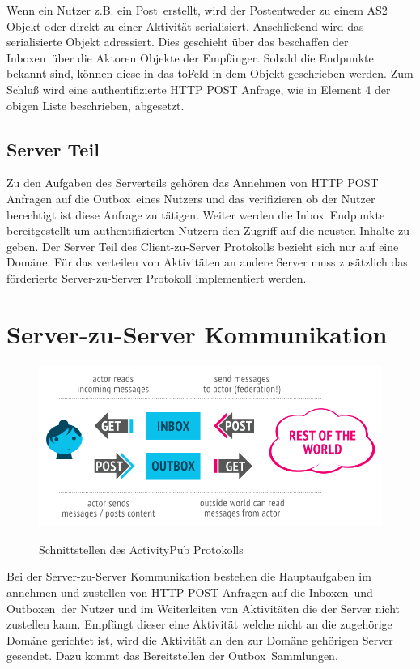 		Wenn ein Nutzer z.B. ein \glqq Post\grqq~erstellt, wird der \glqq Post\grqq entweder zu einem \gls{AS2} Objekt oder direkt zu einer Aktivität serialisiert. Anschließend wird das serialisierte Objekt adressiert. Dies geschieht über das beschaffen der \glqq Inboxen\grqq~über die Aktoren Objekte der Empfänger. Sobald die Endpunkte bekannt sind, können diese in das \glqq to\grqq Feld in dem Objekt geschrieben werden. Zum Schluß wird eine authentifizierte HTTP POST Anfrage, wie in Element 4 der obigen Liste beschrieben, abgesetzt.

	\subsection{Server Teil} 
		Zu den Aufgaben des Serverteils gehören das Annehmen von HTTP POST Anfragen auf die \glqq Outbox\grqq~eines Nutzers und das verifizieren ob der Nutzer berechtigt ist diese Anfrage zu tätigen. Weiter werden die \glqq Inbox\grqq~Endpunkte bereitgestellt um authentifizierten Nutzern den Zugriff auf die neusten Inhalte zu geben. Der Server Teil des Client-zu-Server Protokolls bezieht sich nur auf eine Domäne. Für das verteilen von Aktivitäten an andere Server muss zusätzlich das förderierte Server-zu-Server Protokoll implementiert werden.

\section{Server-zu-Server Kommunikation}
	\begin{figure}[h]
		\centering
		\includegraphics[scale=0.55]{figures/client-server-federated.png}
		\label{Client zu Server und Server zu Server Interaktionen}
		\caption{Schnittstellen des ActivityPub Protokolls}
	\end{figure}
	Bei der Server-zu-Server Kommunikation bestehen die Hauptaufgaben im annehmen und zustellen von HTTP POST Anfragen auf die \glqq Inboxen\grqq~und \glqq Outboxen\grqq~der Nutzer und im Weiterleiten von Aktivitäten die der Server nicht zustellen kann. Empfängt dieser eine Aktivität welche nicht an die zugehörige Domäne gerichtet ist, wird die Aktivität an den zur Domäne gehörigen Server gesendet. Dazu kommt das Bereitstellen der \glqq Outbox\grqq~Sammlungen.
	
